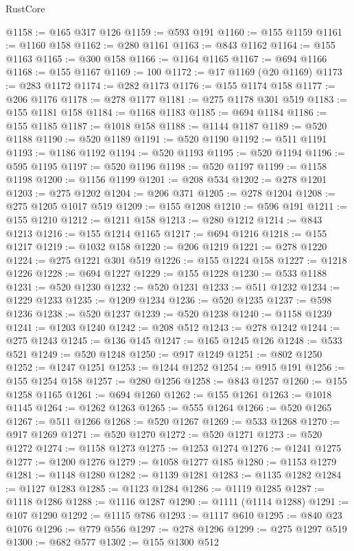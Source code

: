 \begin{lexlean}{RustCore}
\begin{coremodule}
@1158 := @165 @317 @126
@1159 := @593 @191
@1160 := @155 @1159
@1161 := @1160 @158
@1162 := @280 @1161
@1163 := @843 @1162
@1164 := @155 @1163
@1165 := @300 @158
@1166 := @1164 @1165
@1167 := @694 @1166
@1168 := @155 @1167
@1169 := 100
@1172 := @17 @1169 (@20 @1169)
@1173 := @283 @1172
@1174 := @282 @1173
@1176 := @155 @1174 @158
@1177 := @206 @1176
@1178 := @278 @1177
@1181 := @275 @1178 @301 @519
@1183 := @155 @1181 @158
@1184 := @1168 @1183
@1185 := @694 @1184
@1186 := @155 @1185
@1187 := @1018 @158
@1188 := @1144 @1187
@1189 := @520 @1188
@1190 := @520 @1189
@1191 := @520 @1190
@1192 := @511 @1191
@1193 := @1186 @1192
@1194 := @520 @1193
@1195 := @520 @1194
@1196 := @595 @1195
@1197 := @520 @1196
@1198 := @520 @1197
@1199 := @1158 @1198
@1200 := @1156 @1199
@1201 := @208 @534
@1202 := @278 @1201
@1203 := @275 @1202
@1204 := @206 @371
@1205 := @278 @1204
@1208 := @275 @1205 @1017 @519
@1209 := @155 @1208
@1210 := @596 @191
@1211 := @155 @1210
@1212 := @1211 @158
@1213 := @280 @1212
@1214 := @843 @1213
@1216 := @155 @1214 @1165
@1217 := @694 @1216
@1218 := @155 @1217
@1219 := @1032 @158
@1220 := @206 @1219
@1221 := @278 @1220
@1224 := @275 @1221 @301 @519
@1226 := @155 @1224 @158
@1227 := @1218 @1226
@1228 := @694 @1227
@1229 := @155 @1228
@1230 := @533 @1188
@1231 := @520 @1230
@1232 := @520 @1231
@1233 := @511 @1232
@1234 := @1229 @1233
@1235 := @1209 @1234
@1236 := @520 @1235
@1237 := @598 @1236
@1238 := @520 @1237
@1239 := @520 @1238
@1240 := @1158 @1239
@1241 := @1203 @1240
@1242 := @208 @512
@1243 := @278 @1242
@1244 := @275 @1243
@1245 := @136 @145
@1247 := @165 @1245 @126
@1248 := @533 @521
@1249 := @520 @1248
@1250 := @917 @1249
@1251 := @802 @1250
@1252 := @1247 @1251
@1253 := @1244 @1252
@1254 := @915 @191
@1256 := @155 @1254 @158
@1257 := @280 @1256
@1258 := @843 @1257
@1260 := @155 @1258 @1165
@1261 := @694 @1260
@1262 := @155 @1261
@1263 := @1018 @1145
@1264 := @1262 @1263
@1265 := @555 @1264
@1266 := @520 @1265
@1267 := @511 @1266
@1268 := @520 @1267
@1269 := @533 @1268
@1270 := @917 @1269
@1271 := @520 @1270
@1272 := @520 @1271
@1273 := @520 @1272
@1274 := @1158 @1273
@1275 := @1253 @1274
@1276 := @1241 @1275
@1277 := @1200 @1276
@1279 := @1058 @1277 @185
@1280 := @1153 @1279
@1281 := @1148 @1280
@1282 := @1139 @1281
@1283 := @1135 @1282
@1284 := @1127 @1283
@1285 := @1123 @1284
@1286 := @1119 @1285
@1287 := @1118 @1286
@1288 := @1116 @1287
@1290 := @1111 (@1114 @1288)
@1291 := @107 @1290
@1292 := @1115 @786
@1293 := @1117 @610
@1295 := @840 @23 @1076
@1296 := @779 @556
@1297 := @278 @1296
@1299 := @275 @1297 @519
@1300 := @682 @577
@1302 := @155 @1300 @512

\end{coremodule}
\end{lexlean}
